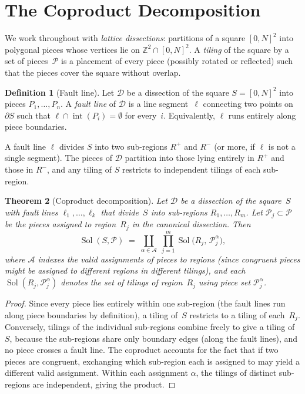 \documentclass[12pt]{article}
\newtheorem{theorem}{Theorem}[section]
\theoremstyle{definition}
\newtheorem{definition}[theorem]{Definition}
\theoremstyle{remark}
\newcommand{\Sol}{\operatorname{Sol}}
\newcommand{\ZZ}{\mathbb{Z}}
\begin{document}
\section{The Coproduct Decomposition}
\label{sec:coproduct}

We work throughout with \emph{lattice dissections}: partitions of a
square $[0,N]^2$ into polygonal pieces whose vertices lie on
$\ZZ^2 \cap [0,N]^2$. A \emph{tiling} of the square by a set of
pieces~$\mathcal{P}$ is a placement of every piece (possibly rotated or
reflected) such that the pieces cover the square without overlap.

\begin{definition}[Fault line]
\label{def:fault}
Let $\mathcal{D}$ be a dissection of the square $S = [0,N]^2$ into
pieces $P_1, \ldots, P_n$. A \emph{fault line} of $\mathcal{D}$ is a
line segment~$\ell$ connecting two points on~$\partial S$ such that
$\ell \cap \operatorname{int}(P_i) = \emptyset$ for every~$i$.
Equivalently, $\ell$ runs entirely along piece boundaries.
\end{definition}

A fault line $\ell$ divides $S$ into two sub-regions $R^+$ and $R^-$
(or more, if $\ell$ is not a single segment). The pieces of $\mathcal{D}$
partition into those lying entirely in $R^+$ and those in $R^-$, and any
tiling of $S$ restricts to independent tilings of each sub-region.

\begin{theorem}[Coproduct decomposition]
\label{thm:coproduct}
Let $\mathcal{D}$ be a dissection of the square~$S$ with fault lines
$\ell_1, \ldots, \ell_k$ that divide~$S$ into sub-regions
$R_1, \ldots, R_m$. Let $\mathcal{P}_j \subset \mathcal{P}$ be the
pieces assigned to region~$R_j$ in the canonical dissection. Then
\[
\Sol(S, \mathcal{P})
\;=\;
\coprod_{\alpha \in \mathcal{A}}
\;\prod_{j=1}^{m}
\Sol\bigl(R_j,\, \mathcal{P}_j^\alpha\bigr),
\]
where $\mathcal{A}$ indexes the valid assignments of pieces to regions
(since congruent pieces might be assigned to different regions in
different tilings), and each $\Sol(R_j, \mathcal{P}_j^\alpha)$
denotes the set of tilings of region~$R_j$ using piece set
$\mathcal{P}_j^\alpha$.
\end{theorem}

\begin{proof}
Since every piece lies entirely within one sub-region (the fault lines
run along piece boundaries by definition), a tiling of~$S$ restricts to
a tiling of each~$R_j$. Conversely, tilings of the individual
sub-regions combine freely to give a tiling of~$S$, because the sub-regions
share only boundary edges (along the fault lines), and no piece crosses a
fault line. The coproduct accounts for the fact that if two pieces are
congruent, exchanging which sub-region each is assigned to may yield a
different valid assignment. Within each assignment $\alpha$, the tilings
of distinct sub-regions are independent, giving the product.
\end{proof}
\end{document}
